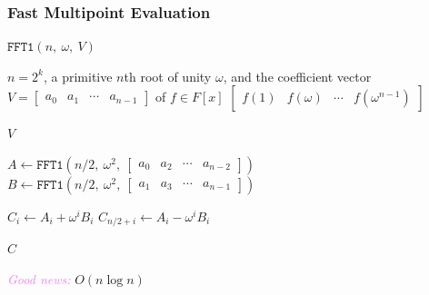 \documentclass{beamer}
\newcommand{\its}[1]{\textcolor{violet}{\emph{#1}}}
\begin{document}
\begin{frame}
    \frametitle{Fast Multipoint Evaluation}

    $\texttt{FFT1}(n,\ \omega,\ V)$
    \begin{algorithmic}
        \Require $n = 2^k$, a primitive $n$th root of unity $\omega$, and the
        coefficient vector $V = \begin{bmatrix} a_0 & a_1 & \cdots & a_{n - 1}
        \end{bmatrix}$ of $f \in F[x]$
        \Ensure $\begin{bmatrix} f(1) & f(\omega) & \cdots & f(\omega^{n - 1})
        \end{bmatrix}$
        \pause \vfill

         \State \Return $V$ \EndIf
        \pause \vfill

        \State $A \gets \texttt{FFT1}(n/2,\ \omega^2,\
        \begin{bmatrix} a_0 & a_2 & \cdots & a_{n - 2} \end{bmatrix})$
        \State $B \gets \texttt{FFT1}(n/2,\ \omega^2,\
        \begin{bmatrix} a_1 & a_3 & \cdots & a_{n - 1} \end{bmatrix})$
        \pause \vfill

            \State $C_i \gets A_i + \omega^iB_i$
            \State $C_{n/2 + i} \gets A_i - \omega^iB_i$
        \EndFor
        \pause \vfill

        \State \Return $C$
    \end{algorithmic}

    \pause \vfill

    \its{Good news:} $O(n\log n)$
\end{frame}
\end{document}

